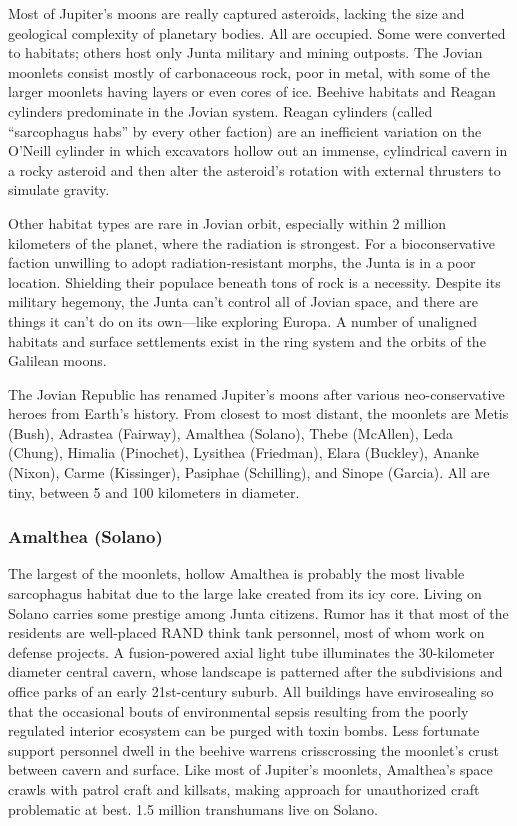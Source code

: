Most of Jupiter's moons are really captured asteroids, lacking the size and geological complexity of planetary bodies. All are occupied. Some were converted to habitats; others host only Junta military and mining outposts. The Jovian moonlets consist mostly of carbonaceous rock, poor in metal, with some of the larger moonlets having layers or even cores of ice. Beehive habitats and Reagan cylinders predominate in the Jovian system. Reagan cylinders (called “sarcophagus habs” by every other faction) are an inefficient variation on the O'Neill cylinder in which excavators hollow out an immense, cylindrical cavern in a rocky asteroid and then alter the asteroid's rotation with external thrusters to simulate gravity. 

Other habitat types are rare in Jovian orbit, especially within 2 million kilometers of the planet, where the radiation is strongest. For a bioconservative faction unwilling to adopt radiation-resistant morphs, the Junta is in a poor location. Shielding their populace beneath tons of rock is a necessity. Despite its military hegemony, the Junta can't control all of Jovian space, and there are things it can't do on its own—like exploring Europa. A number of unaligned habitats and surface settlements exist in the ring system and the orbits of the Galilean moons. 

The Jovian Republic has renamed Jupiter's moons after various neo-conservative heroes from Earth's history. From closest to most distant, the moonlets are Metis (Bush), Adrastea (Fairway), Amalthea (Solano), Thebe (McAllen), Leda (Chung), Himalia (Pinochet), Lysithea (Friedman), Elara (Buckley), Ananke (Nixon), Carme (Kissinger), Pasiphae (Schilling), and Sinope (Garcia). All are tiny, between 5 and 100 kilometers in diameter. 

\subsubsection{Amalthea (Solano)} \label{sec:amalthea-solano} 

The largest of the moonlets, hollow Amalthea is probably the most livable sarcophagus habitat due to the large lake created from its icy core. Living on Solano carries some prestige among Junta citizens. Rumor has it that most of the residents are well-placed RAND think tank personnel, most of whom work on defense projects. A fusion-powered axial light tube illuminates the 30-kilometer diameter central cavern, whose landscape is patterned after the subdivisions and office parks of an early 21st-century suburb. All buildings have envirosealing so that the occasional bouts of environmental sepsis resulting from the poorly regulated interior ecosystem can be purged with toxin bombs. Less fortunate support personnel dwell in the beehive warrens crisscrossing the moonlet's crust between cavern and surface. Like most of Jupiter's moonlets, Amalthea's space crawls with patrol craft and killsats, making approach for unauthorized craft problematic at best. 1.5 million transhumans live on Solano. 

